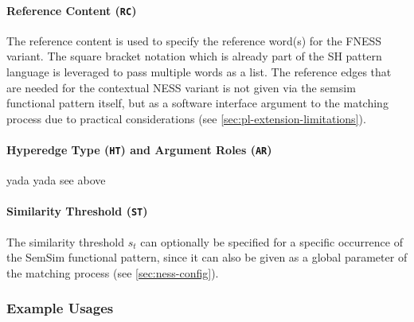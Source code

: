 \documentclass[11pt]{scrreprt}
\begin{document}
\paragraph{Reference Content (\texttt{RC})} 
The reference content is used to specify the reference word(s) for the  FNESS variant. The square bracket notation which is already part of the SH pattern language is leveraged to pass multiple words as a list. The reference edges that are needed for the contextual NESS variant is not given via the semsim functional pattern itself, but as a software interface argument to the matching process due to practical considerations (see \cref{sec:pl-extension-limitations}).


\paragraph{Hyperedge Type (\texttt{HT}) and Argument Roles (\texttt{AR})}
yada yada see above 


\paragraph{Similarity Threshold (\texttt{ST})}
The similarity threshold \(s_t\) can optionally be specified for a specific occurrence of the SemSim functional pattern, since it can also be given as a global parameter of the matching process (see \cref{sec:ness-config}). 

\subsubsection{Example Usages}
\end{document}
